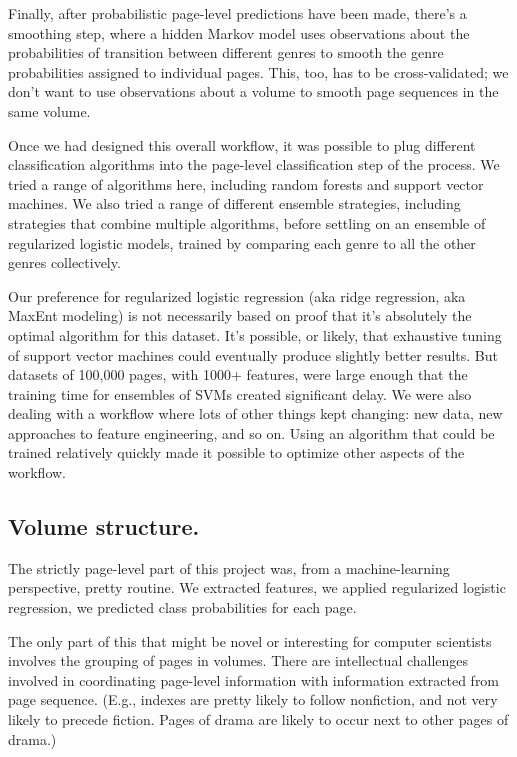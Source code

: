 \documentclass[paper=a4, fontsize=12pt]{scrartcl}
\numberwithin{equation}{section}		%
\numberwithin{figure}{section}			%
\numberwithin{table}{section}				%
\begin{document}
Finally, after probabilistic page-level predictions have been made, there's a smoothing step, where a hidden Markov model uses observations about the probabilities of transition between different genres to smooth the genre probabilities assigned to individual pages. This, too, has to be cross-validated; we don't want to use observations about a volume to smooth page sequences in the same volume.

Once we had designed this overall workflow, it was possible to plug different classification algorithms into the page-level classification step of the process. We tried a range of algorithms here, including random forests and support vector machines. We also tried a range of different ensemble strategies, including strategies that combine multiple algorithms, before settling on an ensemble of regularized logistic models, trained by comparing each genre to all the other genres collectively.

Our preference for regularized logistic regression (aka ridge regression, aka MaxEnt modeling) is not necessarily based on proof that it's absolutely the optimal algorithm for this dataset. It's possible, or likely, that exhaustive tuning of support vector machines could eventually produce slightly better results. But datasets of 100,000 pages, with 1000+ features, were large enough that the training time for ensembles of SVMs created significant delay. We were also dealing with a workflow where lots of other things kept changing: new data, new approaches to feature engineering, and so on. Using an algorithm that could be trained relatively quickly made it possible to optimize other aspects of the workflow.

\subsection{Volume structure.}

The strictly page-level part of this project was, from a machine-learning perspective, pretty routine. We extracted features, we applied regularized logistic regression, we predicted class probabilities for each page.

The only part of this that might be novel or interesting for computer scientists involves the grouping of pages in volumes. There are intellectual challenges involved in coordinating page-level information with information extracted from page sequence. (E.g., indexes are pretty likely to follow nonfiction, and not very likely to precede fiction. Pages of drama are likely to occur next to other pages of drama.)
\end{document}
